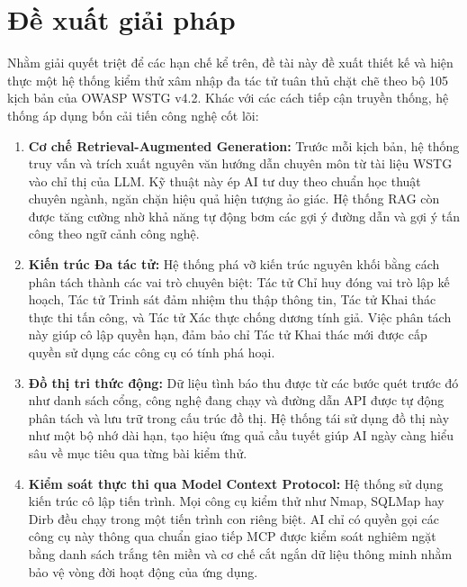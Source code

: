 \section{Đề xuất giải pháp}
Nhằm giải quyết triệt để các hạn chế kể trên, đề tài này đề xuất thiết kế và hiện thực một hệ thống kiểm thử xâm nhập đa tác tử tuân thủ chặt chẽ theo bộ 105 kịch bản của OWASP WSTG v4.2. Khác với các cách tiếp cận truyền thống, hệ thống áp dụng bốn cải tiến công nghệ cốt lõi:

\begin{enumerate}
    \item \textbf{Cơ chế Retrieval-Augmented Generation:} Trước mỗi kịch bản, hệ thống truy vấn và trích xuất nguyên văn hướng dẫn chuyên môn từ tài liệu WSTG vào chỉ thị của LLM. Kỹ thuật này ép AI tư duy theo chuẩn học thuật chuyên ngành, ngăn chặn hiệu quả hiện tượng ảo giác. Hệ thống RAG còn được tăng cường nhờ khả năng tự động bơm các gợi ý đường dẫn và gợi ý tấn công theo ngữ cảnh công nghệ.
    \item \textbf{Kiến trúc Đa tác tử:} Hệ thống phá vỡ kiến trúc nguyên khối bằng cách phân tách thành các vai trò chuyên biệt: Tác tử Chỉ huy đóng vai trò lập kế hoạch, Tác tử Trinh sát đảm nhiệm thu thập thông tin, Tác tử Khai thác thực thi tấn công, và Tác tử Xác thực chống dương tính giả. Việc phân tách này giúp cô lập quyền hạn, đảm bảo chỉ Tác tử Khai thác mới được cấp quyền sử dụng các công cụ có tính phá hoại.
    \item \textbf{Đồ thị tri thức động:} Dữ liệu tình báo thu được từ các bước quét trước đó như danh sách cổng, công nghệ đang chạy và đường dẫn API được tự động phân tách và lưu trữ trong cấu trúc đồ thị. Hệ thống tái sử dụng đồ thị này như một bộ nhớ dài hạn, tạo hiệu ứng quả cầu tuyết giúp AI ngày càng hiểu sâu về mục tiêu qua từng bài kiểm thử.
    \item \textbf{Kiểm soát thực thi qua Model Context Protocol:} Hệ thống sử dụng kiến trúc cô lập tiến trình. Mọi công cụ kiểm thử như Nmap, SQLMap hay Dirb đều chạy trong một tiến trình con riêng biệt. AI chỉ có quyền gọi các công cụ này thông qua chuẩn giao tiếp MCP được kiểm soát nghiêm ngặt bằng danh sách trắng tên miền và cơ chế cắt ngắn dữ liệu thông minh nhằm bảo vệ vòng đời hoạt động của ứng dụng.
\end{enumerate}
